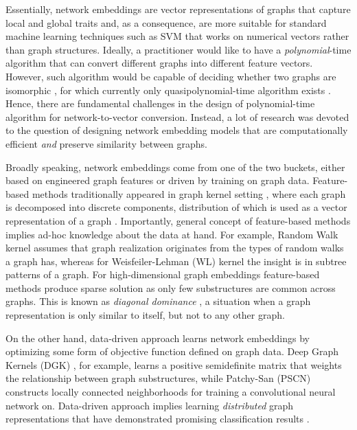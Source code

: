 \documentclass{article}
\theoremstyle{definition}
\begin{document}
Essentially, network embeddings are vector representations of graphs that capture  local and global traits and, as a consequence, are more suitable for standard machine learning techniques such as SVM that works on numerical vectors rather than graph structures. Ideally, a practitioner would like to have a \textit{polynomial}-time algorithm that can convert different graphs into different feature vectors. However, such algorithm would be capable of deciding whether two graphs are isomorphic \cite{gartner:hardness}, for which currently only quasipolynomial-time algorithm exists \cite{babai}. Hence, there are fundamental challenges in the design of polynomial-time algorithm for network-to-vector conversion. Instead, a lot of research was devoted to the question of designing network embedding models that are computationally efficient \textit{and} preserve similarity between graphs.





Broadly speaking, network embeddings come from one of the two buckets, either based on engineered graph features or driven by training on graph data. Feature-based methods traditionally appeared in graph kernel setting \cite{rwkernel:10}, where each graph is decomposed into discrete components, distribution of which is used as a vector representation of a graph \cite{rconvolution}. Importantly, general concept of feature-based methods implies ad-hoc knowledge about the data at hand. For example, Random Walk kernel \cite{rwkernel:10} assumes that graph realization originates from the types of random walks a graph has, whereas for Weisfeiler-Lehman (WL) kernel \cite{wlkernel:11} the insight is in subtree patterns of a graph. For high-dimensional graph embeddings feature-based methods produce sparse solution as only few substructures are common across graphs. This is known as \textit{diagonal dominance} \cite{deepgraph}, a situation when a graph representation is only similar to itself, but not to any other graph. 

On the other hand, data-driven approach learns network embeddings by optimizing some form of objective function defined on graph data. Deep Graph Kernels (DGK) \cite{deepgraph}, for example, learns a positive semidefinite matrix that weights the relationship between graph substructures, while Patchy-San (PSCN) \cite{learncnn:16} constructs locally connected neighborhoods for training a convolutional neural network on. Data-driven approach implies learning \textit{distributed} graph representations that have demonstrated promising classification results \cite{learncnn:16, 2dcnn}.
\end{document}
